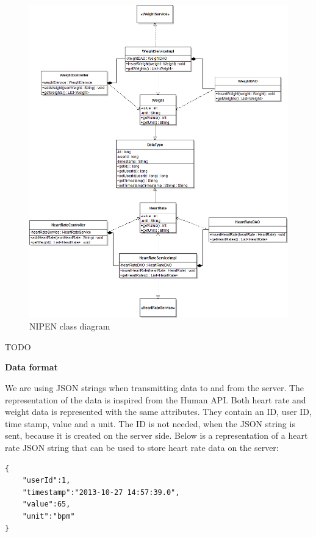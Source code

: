 \begin{figure}[h]
\centering
\includegraphics[scale=0.5]{../Figures/NIPEN-class-diagram.png}
\caption{NIPEN class diagram}
\label{figure:nipen-class-diagram}
\end{figure}

TODO

\textbf{Data format}

We are using JSON strings when transmitting data to and from the server.
The representation of the data is inspired from the Human API.
Both heart rate and weight data is represented with the same attributes.
They contain an ID, user ID, time stamp, value and a unit.
The ID is not needed, when the JSON string is sent, because it is created on the server side.
Below is a representation of a heart rate JSON string that can be used to store heart rate data on the server:

\begin{verbatim}
{
    "userId":1,
    "timestamp":"2013-10-27 14:57:39.0",
    "value":65,
    "unit":"bpm"
}
\end{verbatim}

